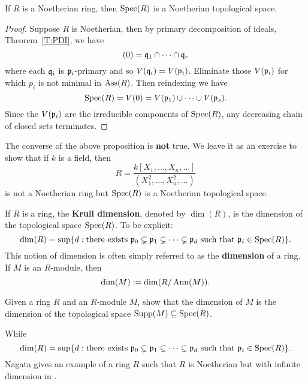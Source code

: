 \documentclass{ximera}
\begin{document}
\begin{proposition}
  If $R$ is a Noetherian ring, then $\operatorname{Spec}(R)$ is a Noetherian
  topological space.
  \begin{proof}
    Suppose $R$ is Noetherian, then by primary decomposition of
    ideals, Theorem~\ref{T:PDI}, we have
    \[
    (0) = \mathfrak{q}_1\cap \dots \cap \mathfrak{q}_r
    \]
    where each $\mathfrak{q}_i$ is $\mathfrak{p}_i$-primary and so $V(\mathfrak{q}_i) =
    V(\mathfrak{p}_i)$. Eliminate those $V(\mathfrak{p}_i)$ for which $p_i$ is not minimal
    in $\operatorname{Ass}(R)$.  Then reindexing we have
    \[
    \operatorname{Spec}(R) = V(0) = V(\mathfrak{p}_1) \cup\dots \cup V(\mathfrak{p}_s). 
    \]
    Since the $V(\mathfrak{p}_i)$ are the irreducible components of $\operatorname{Spec}(R)$,
    any decreasing chain of closed sets terminates.
  \end{proof}
\end{proposition}



\begin{warning}
  The converse of the above proposition is \textbf{not} true. We leave
  it as an exercise to show that if $k$ is a field, then
  \[
  R = \frac{k[X_1,\dots,X_n,\dots]}{(X_1^2,\dots,X_n^2,\dots)}
  \]
  is not a Noetherian ring but $\operatorname{Spec}(R)$ is a Noetherian topological space.
\end{warning}


\begin{definition}
  If $R$ is a ring, the \textbf{Krull dimension}, denoted by
  $\dim(R)$, is the dimension of the topological space $\operatorname{Spec}(R)$. To
  be explicit:
  \[
  \dim(R) = \sup \{ d : \text{there exists $\mathfrak{p}_0\subsetneq \mathfrak{p}_1
    \subsetneq \dots \subsetneq \mathfrak{p}_d$ such that $\mathfrak{p}_i \in \operatorname{Spec}(R)$} \}.
  \]
  This notion of dimension is often simply referred to as the
  \textbf{dimension} of a ring. If $M$ is an $R$-module, then
  \[
  \dim(M) := \dim(R/\operatorname{Ann}(M)).
  \]
\end{definition}


\begin{exercise}
  Given a ring $R$ and an $R$-module $M$, show that the dimension of
  $M$ is the dimension of the topological space $\operatorname{Supp}(M)\subseteq
  \operatorname{Spec}(R)$.
\end{exercise}

\begin{example}
  While
  \[
  \dim(R) = \sup \{ d : \text{there exists $\mathfrak{p}_0\subsetneq \mathfrak{p}_1 \subsetneq \dots \subsetneq \mathfrak{p}_d$ such that $\mathfrak{p}_i \in \operatorname{Spec}(R)$} \}.
  \]
  Nagata gives an example of a ring $R$ such that $R$ is Noetherian
  but with infinite dimension in \cite{mN1962}.
\end{example}
\end{document}
